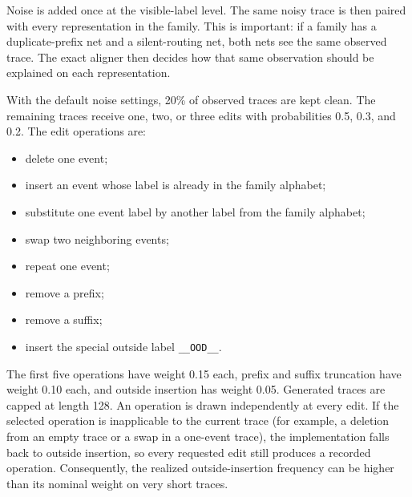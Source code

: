 \documentclass[11pt]{article}
\begin{document}
Noise is added once at the visible-label level. The same noisy trace is then
paired with every representation in the family. This is important: if a family
has a duplicate-prefix net and a silent-routing net, both nets see the same
observed trace. The exact aligner then decides how that same observation should
be explained on each representation.

With the default noise settings, 20\% of observed traces are kept clean. The
remaining traces receive one, two, or three edits with probabilities 0.5, 0.3,
and 0.2. The edit operations are:
\begin{itemize}
  \item delete one event;
  \item insert an event whose label is already in the family alphabet;
  \item substitute one event label by another label from the family alphabet;
  \item swap two neighboring events;
  \item repeat one event;
  \item remove a prefix;
  \item remove a suffix;
  \item insert the special outside label \texttt{\_\_OOD\_\_}.
\end{itemize}
The first five operations have weight 0.15 each, prefix and suffix truncation
have weight 0.10 each, and outside insertion has weight 0.05. Generated traces
are capped at length 128. An operation is drawn independently at every edit. If
the selected operation is inapplicable to the current trace (for example, a
deletion from an empty trace or a swap in a one-event trace), the implementation
falls back to outside insertion, so every requested edit still produces a
recorded operation. Consequently, the realized outside-insertion frequency can
be higher than its nominal weight on very short traces.
\end{document}
